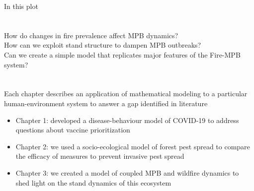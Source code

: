 \documentclass{article}
\begin{document}
In this plot 


\section{}
How do changes in fire prevalence affect MPB dynamics?   \\
\vspace{0.5cm}
How can we exploit stand structure to dampen MPB outbreaks? \\
\vspace{0.5cm}
Can we create a simple model that replicates major features of the Fire-MPB system?

\section{}
Each chapter describes an application of mathematical modeling to a particular human-environment system to answer a gap identified in literature
\begin{itemize}
    \item Chapter 1: developed a disease-behaviour model of COVID-19 to address questions about vaccine prioritization
    \item Chapter 2: we used a socio-ecological model of forest pest spread to compare the efficacy of measures to prevent invasive pest spread
    \item Chapter 3: we created a model of coupled MPB and wildfire dynamics to shed light on the stand dynamics of this ecosystem 
\end{itemize}
\section{}
\end{document}
